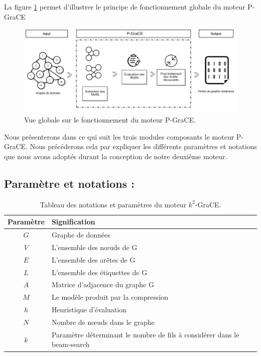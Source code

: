 \documentclass[a4paper,oneside,12pt]{report}
\theoremstyle{definition}
\begin{document}
La figure \ref{P_grace} permet d'illustrer le principe de fonctionnement globale du moteur \gls{P-GraCE}


\begin{figure}[H]
	\includegraphics[scale=0.48]{./ressources/image/pgrace.jpg}
	\caption[Vue globale sur le fonctionnement du moteur \gls{P-GraCE}.]{Vue globale sur le fonctionnement du moteur \gls{P-GraCE}.}
	\label{P_grace}
\end{figure}

Nous présenterons dans ce qui suit les trois modules composants le moteur P-GraCE. Nous précéderons  cela par expliquer les différents paramètres et notations que nous avons adoptés durant la conception de notre deuxième moteur.
		
		\subsection{Paramètre et notations :}
		
			\begin{table}[H]
		\centering
		\begin{tabular}{|c|L{12cm}|}
		\hline Paramètre & Signification \\ \hline\hline 
		$G$ & Graphe de données \\ \hline
		$V$ & L'ensemble des nœuds de G\\ \hline
		$E$ & L'ensemble des arêtes de G \\ \hline
		$L$ & L'ensemble des étiquettes de G \\ \hline
		$A$ & Matrice d'adjacence du graphe G\\ \hline
		$M$ & Le modèle produit par la compression\\ \hline
		$h$ & Heuristique d'évaluation \\ \hline
		$N$ & Nombre de nœuds dans le graphe \\ \hline
		$k$ & Paramètre déterminant le nombre de fils à considérer dans le beam-search\\ \hline
		
		\end{tabular}
		\caption{Tableau des notations et paramètres du moteur $k^2$-GraCE.}	
		\label{notk2grace}		
	\end{table}
		
\end{document}
